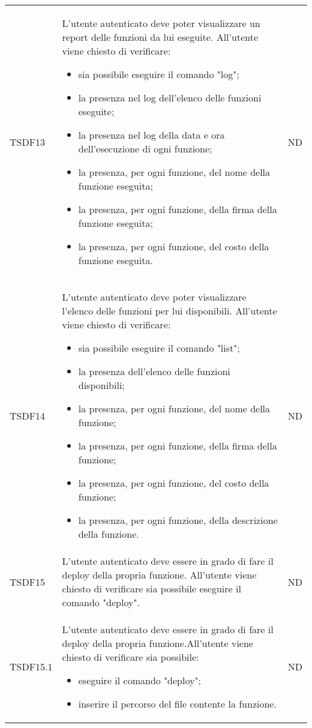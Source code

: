 \begin{longtable}{|C{2cm}|C{8cm}|C{2cm}|}
	TSDF13  &
	L’utente autenticato deve poter visualizzare un report delle funzioni da lui eseguite. All’utente viene chiesto di verificare:
	\begin{itemize}
		\item sia possibile eseguire il comando "log";
		\item la presenza nel log dell'elenco delle funzioni eseguite;
		\item la presenza nel log della data e ora dell'esecuzione di ogni funzione;
		\item la presenza, per ogni funzione, del nome della funzione eseguita;
		\item la presenza, per ogni funzione, della firma della funzione eseguita;
		\item la presenza, per ogni funzione, del costo della funzione eseguita.
	\end{itemize} &
	ND \\
	
	TSDF14  &
	L’utente autenticato deve poter visualizzare l'elenco delle funzioni per lui disponibili. All’utente viene chiesto di verificare:
	\begin{itemize}
		\item sia possibile eseguire il comando "list";
		\item la presenza dell'elenco delle funzioni disponibili;
		\item la presenza, per ogni funzione, del nome della funzione;
		\item la presenza, per ogni funzione, della firma della funzione;
		\item la presenza, per ogni funzione, del costo della funzione;
		\item la presenza, per ogni funzione, della descrizione della funzione.
	\end{itemize} &
	ND \\
	
	TSDF15  &
	L'utente autenticato deve essere in grado di fare il deploy della propria funzione.
	All’utente viene chiesto di verificare sia possibile eseguire il comando "deploy". &
	ND \\
	
	TSDF15.1  &
	L'utente autenticato deve essere in grado di fare il deploy della propria funzione.All’utente viene chiesto di verificare sia possibile:
	\begin{itemize}
		\item eseguire il comando "deploy";
		\item inserire il percorso del file contente la funzione.
	\end{itemize} &
	ND \\
	

\end{longtable}
